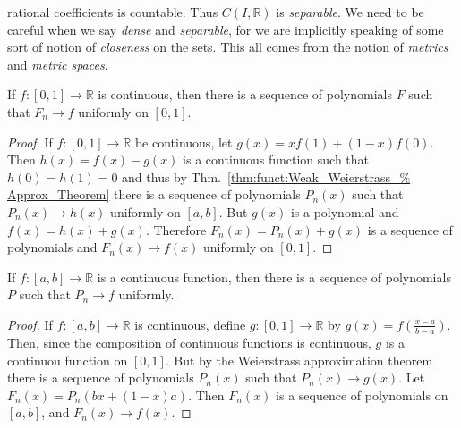 \documentclass[crop=false,class=book,oneside]{standalone}
\begin{document}
            rational coefficients is countable. Thus
            $C(I,\mathbb{R})$ is \textit{separable}. We need
            to be careful when we say \textit{dense} and
            \textit{separable}, for we are implicitly speaking
            of some sort of notion of \textit{closeness} on the
            sets. This all comes from the notion of
            \textit{metrics} and \textit{metric spaces}.
            \begin{theorem}
                    \label{thm:Funct:Weierstrass_%
                           Approx_on_unit_interval}
                    If $f:[0,1]\rightarrow\mathbb{R}$ is
                    continuous, then there is a sequence
                    of polynomials $F$ such that
                    $F_{n}\rightarrow{f}$ uniformly on $[0,1]$.
                \end{theorem}
            \begin{proof}
                    If $f:[0,1]\rightarrow\mathbb{R}$ be
                    continuous, let
                    $g(x)=xf(1)+(1-x)f(0)$. Then
                    $h(x)=f(x)-g(x)$ is a continuous function
                    such that $h(0)=h(1)=0$ and thus by
                    Thm.~\ref{thm:funct:Weak_Weierstrass_%
                              Approx_Theorem}
                    there is a sequence of polynomials
                    $P_{n}(x)$ such that
                    $P_{n}(x)\rightarrow{h(x)}$
                    uniformly on $[a,b]$.
                    But $g(x)$ is a polynomial and
                    $f(x)=h(x)+g(x)$. Therefore
                    $F_{n}(x)=P_{n}(x)+g(x)$ is a sequence
                    of polynomials and
                    $F_{n}(x)\rightarrow{f(x)}$
                    uniformly on $[0,1]$.
                \end{proof}
            \begin{theorem}
                If $f:[a,b]\rightarrow\mathbb{R}$ is a
                continuous function, then there is a sequence
                of polynomials $P$ such that
                $P_{n}\rightarrow{f}$ uniformly.
            \end{theorem}
            \begin{proof}
                If $f:[a,b]\rightarrow\mathbb{R}$ is
                continuous, define
                $g:[0,1]\rightarrow\mathbb{R}$ by
                $g(x)=f(\frac{x-a}{b-a})$. Then, since
                the composition of continuous functions
                is continuous, $g$ is a continuou function
                on $[0,1]$. But by the Weierstrass
                approximation theorem there is a sequence
                of polynomials $P_{n}(x)$ such that
                $P_{n}(x)\rightarrow{g(x)}$. Let
                $F_{n}(x)=P_{n}(bx+(1-x)a)$. Then
                $F_{n}(x)$ is a sequence of polynomials
                on $[a,b]$, and $F_{n}(x)\rightarrow{f(x)}$.
            \end{proof}
\end{document}
